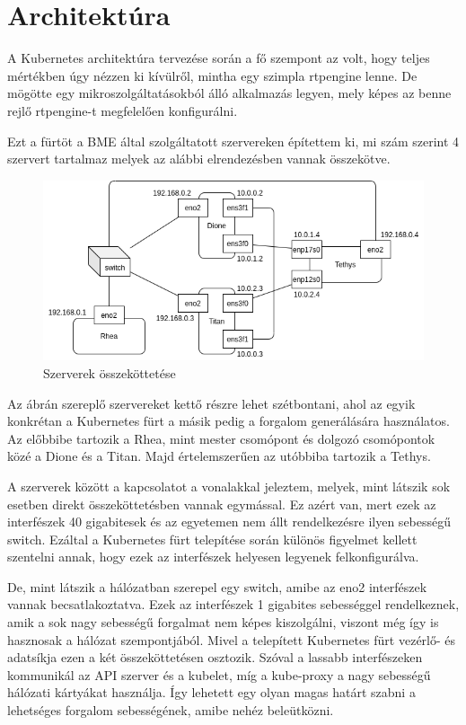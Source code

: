 \chapter{Architektúra}

A Kubernetes architektúra tervezése során a fő szempont az volt, hogy teljes
mértékben úgy nézzen ki kívülről, mintha egy szimpla rtpengine lenne. De 
mögötte egy mikroszolgáltatásokból álló alkalmazás legyen, mely képes
az benne rejlő rtpengine-t megfelelően konfigurálni.

Ezt a fürtöt a BME által szolgáltatott szervereken építettem ki, mi szám szerint
4 szervert tartalmaz melyek az alábbi elrendezésben vannak összekötve.

\begin{figure}[!ht]
	\centering
	\includegraphics[width=1\textwidth, keepaspectratio]{figures/servers.png}
	\caption{Szerverek összeköttetése}
	\label{fig:HVSpaces}
\end{figure}

Az ábrán szereplő szervereket kettő részre lehet szétbontani, ahol az egyik
konkrétan a Kubernetes fürt a másik pedig a forgalom generálására használatos.
Az előbbibe tartozik a Rhea, mint mester csomópont és dolgozó csomópontok közé 
a Dione és a Titan. Majd értelemszerűen az utóbbiba tartozik a Tethys. 

A szerverek között a kapcsolatot a vonalakkal jeleztem, melyek, mint látszik
sok esetben direkt összeköttetésben vannak egymással. Ez azért van, mert ezek
az interfészek 40 gigabitesek és az egyetemen nem állt rendelkezésre ilyen 
sebességű switch. Ezáltal a Kubernetes fürt telepítése során különös figyelmet
kellett szentelni annak, hogy ezek az interfészek helyesen legyenek felkonfigurálva.

De, mint látszik a hálózatban szerepel egy switch, amibe az eno2 interfészek vannak
becsatlakoztatva. Ezek az interfészek 1 gigabites sebességgel rendelkeznek, amik
a sok nagy sebességű forgalmat nem képes kiszolgálni, viszont még így is hasznosak
a hálózat szempontjából. Mivel a telepített Kubernetes fürt vezérlő- és adatsíkja
ezen a két összeköttetésen osztozik. Szóval a lassabb interfészeken kommunikál az
API szerver és a kubelet, míg a kube-proxy a nagy sebességű hálózati kártyákat 
használja. Így lehetett egy olyan magas határt szabni a lehetséges forgalom
sebességének, amibe nehéz beleütközni. 

